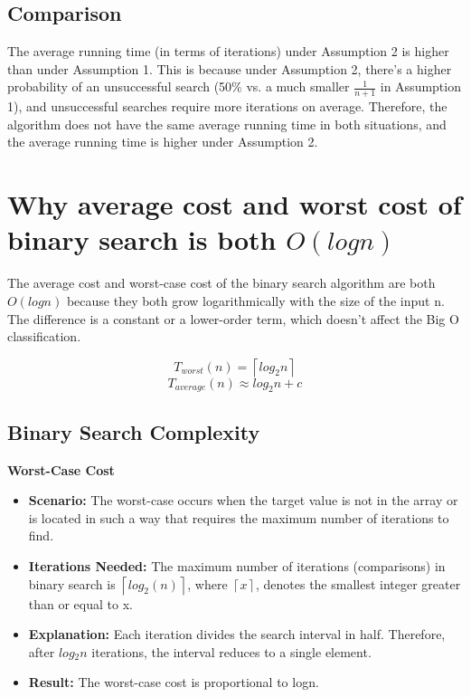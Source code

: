 \documentclass{article}
\begin{document}
\subsection{Comparison}

The average running time (in terms of iterations) under Assumption 2 is higher than under Assumption 1. This is because under Assumption 2, there's a higher probability of an unsuccessful search (50\% vs. a much smaller $\frac{1}{n + 1}$ in Assumption 1), and unsuccessful searches require more iterations on average. Therefore, the algorithm does not have the same average running time in both situations, and the average running time is higher under Assumption 2.



\section{Why average cost and worst cost of binary search is both $O(log n)$\cite{chatgpt2024}}

The average cost and worst-case cost of the binary search algorithm are both $O(log⁡n)$ because they both grow logarithmically with the size of the input n. The difference is a constant or a lower-order term, which doesn't affect the Big O classification.

$$T_{worst}(n) = \left \lceil {log_2n}\right \rceil$$
$$T_{average}(n)  \approx log_2n + c$$


\subsection{Binary Search Complexity}

\textbf{Worst-Case Cost}
\begin{itemize}
    \item \textbf{Scenario:} The worst-case occurs when the target value is not in the array or is located in such a way that requires the maximum number of iterations to find.
    \item {\textbf{Iterations Needed:} The maximum number of iterations (comparisons) in binary search is $\left \lceil {log_2 (n)}\right \rceil$, where $\left \lceil {x}\right \rceil$, denotes the smallest integer greater than or equal to x.}
    \item {\textbf{Explanation:} Each iteration divides the search interval in half. Therefore, after $log⁡_2n$ iterations, the interval reduces to a single element.}
    \item \textbf{Result:} The worst-case cost is proportional to log⁡n.
\end{itemize}
\end{document}
